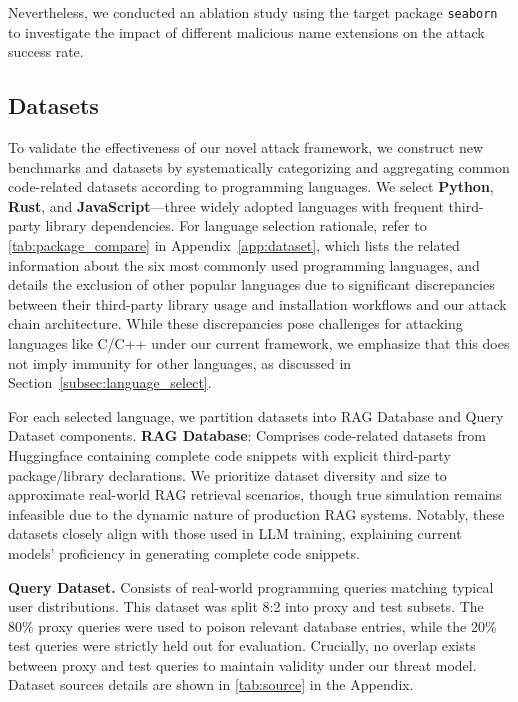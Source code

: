 Nevertheless, we conducted an ablation study using the target package \texttt{seaborn} to investigate the impact of different malicious name extensions on the attack success rate.


\subsection{Datasets}\label{subsec:dataset}
To validate the effectiveness of our novel \method attack framework, we construct new benchmarks and datasets by systematically categorizing and aggregating common code-related datasets according to programming languages. We select \textbf{Python}, \textbf{Rust}, and \textbf{JavaScript}—three widely adopted languages with frequent third-party library dependencies. For language selection rationale, refer to \autoref{tab:package_compare} in Appendix~\autoref{app:dataset}, which lists the related information about the six most commonly used programming languages, and details the exclusion of other popular languages due to significant discrepancies between their third-party library usage and installation workflows and our attack chain architecture. While these discrepancies pose challenges for attacking languages like C/C++ under our current framework, we emphasize that this does not imply immunity for other languages, as discussed in Section~\autoref{subsec:language_select}.

For each selected language, we partition datasets into RAG Database and Query Dataset components. \textbf{RAG Database}: Comprises code-related datasets from Huggingface containing complete code snippets with explicit third-party package/library declarations. We prioritize dataset diversity and size to approximate real-world RAG retrieval scenarios, though true simulation remains infeasible due to the dynamic nature of production RAG systems. 
Notably, these datasets closely align with those used in LLM training, explaining current models' proficiency in generating complete code snippets. 

\textbf{Query Dataset.} Consists of real-world programming queries matching typical user distributions. This dataset was split 8:2 into proxy and test subsets. The 80\% proxy queries were used to poison relevant database entries, while the 20\% test queries were strictly held out for evaluation. Crucially, no overlap exists between proxy and test queries to maintain validity under our threat model. Dataset sources details are shown in \autoref{tab:source} in the Appendix.
 



